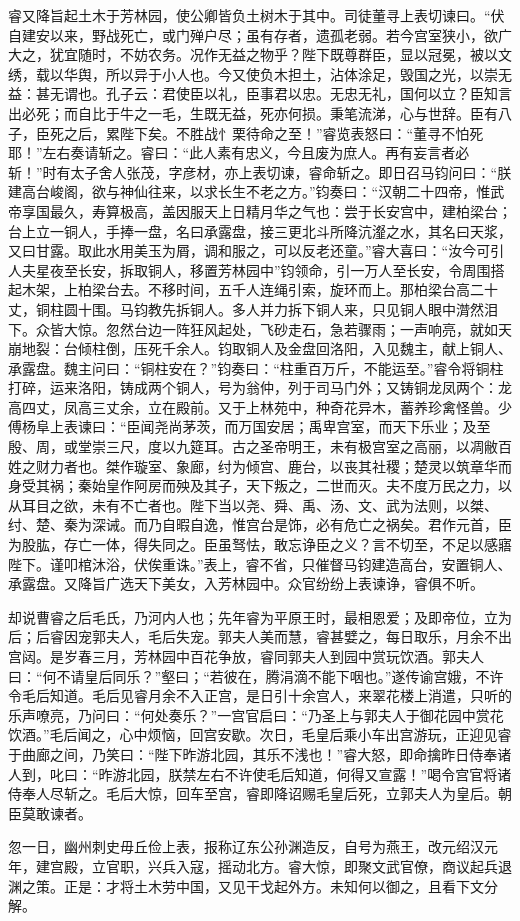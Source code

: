 睿又降旨起土木于芳林园，使公卿皆负土树木于其中。司徒董寻上表切谏曰。“伏自建安以来，野战死亡，或门殚户尽；虽有存者，遗孤老弱。若今宫室狭小，欲广大之，犹宜随时，不妨农务。况作无益之物乎？陛下既尊群臣，显以冠冕，被以文绣，载以华舆，所以异于小人也。今又使负木担土，沾体涂足，毁国之光，以崇无益：甚无谓也。孔子云：君使臣以礼，臣事君以忠。无忠无礼，国何以立？臣知言出必死；而自比于牛之一毛，生既无益，死亦何损。秉笔流涕，心与世辞。臣有八子，臣死之后，累陛下矣。不胜战忄栗待命之至！”睿览表怒曰：“董寻不怕死耶！”左右奏请斩之。睿曰：“此人素有忠义，今且废为庶人。再有妄言者必斩！”时有太子舍人张茂，字彦材，亦上表切谏，睿命斩之。即日召马钧问曰：“朕建高台峻阁，欲与神仙往来，以求长生不老之方。”钧奏曰：“汉朝二十四帝，惟武帝享国最久，寿算极高，盖因服天上日精月华之气也：尝于长安宫中，建柏梁台；台上立一铜人，手捧一盘，名曰承露盘，接三更北斗所降沆瀣之水，其名曰天浆，又曰甘露。取此水用美玉为屑，调和服之，可以反老还童。”睿大喜曰：“汝今可引人夫星夜至长安，拆取铜人，移置芳林园中”钧领命，引一万人至长安，令周围搭起木架，上柏梁台去。不移时间，五千人连绳引索，旋环而上。那柏梁台高二十丈，铜柱圆十围。马钧教先拆铜人。多人并力拆下铜人来，只见铜人眼中潸然泪下。众皆大惊。忽然台边一阵狂风起处，飞砂走石，急若骤雨；一声响亮，就如天崩地裂：台倾柱倒，压死千余人。钧取铜人及金盘回洛阳，入见魏主，献上铜人、承露盘。魏主问曰：“铜柱安在？”钧奏曰：“柱重百万斤，不能运至。”睿令将铜柱打碎，运来洛阳，铸成两个铜人，号为翁仲，列于司马门外；又铸铜龙凤两个：龙高四丈，凤高三丈余，立在殿前。又于上林苑中，种奇花异木，蓄养珍禽怪兽。少傅杨阜上表谏曰：“臣闻尧尚茅茨，而万国安居；禹卑宫室，而天下乐业；及至殷、周，或堂崇三尺，度以九筵耳。古之圣帝明王，未有极宫室之高丽，以凋敝百姓之财力者也。桀作璇室、象廊，纣为倾宫、鹿台，以丧其社稷；楚灵以筑章华而身受其祸；秦始皇作阿房而殃及其子，天下叛之，二世而灭。夫不度万民之力，以从耳目之欲，未有不亡者也。陛下当以尧、舜、禹、汤、文、武为法则，以桀、纣、楚、秦为深诫。而乃自暇自逸，惟宫台是饰，必有危亡之祸矣。君作元首，臣为股肱，存亡一体，得失同之。臣虽驽怯，敢忘诤臣之义？言不切至，不足以感寤陛下。谨叩棺沐浴，伏俟重诛。”表上，睿不省，只催督马钧建造高台，安置铜人、承露盘。又降旨广选天下美女，入芳林园中。众官纷纷上表谏诤，睿俱不听。

却说曹睿之后毛氏，乃河内人也；先年睿为平原王时，最相恩爱；及即帝位，立为后；后睿因宠郭夫人，毛后失宠。郭夫人美而慧，睿甚嬖之，每日取乐，月余不出宫闼。是岁春三月，芳林园中百花争放，睿同郭夫人到园中赏玩饮酒。郭夫人曰：“何不请皇后同乐？”壑曰；“若彼在，腾涓滴不能下咽也。”遂传谕宫娥，不许令毛后知道。毛后见睿月余不入正宫，是日引十余宫人，来翠花楼上消遣，只听的乐声嘹亮，乃问曰：“何处奏乐？”一宫官启曰：“乃圣上与郭夫人于御花园中赏花饮酒。”毛后闻之，心中烦恼，回宫安歇。次日，毛皇后乘小车出宫游玩，正迎见睿于曲廊之间，乃笑曰：“陛下昨游北园，其乐不浅也！”睿大怒，即命擒昨日侍奉诸人到，叱曰：“昨游北园，朕禁左右不许使毛后知道，何得又宣露！”喝令宫官将诸侍奉人尽斩之。毛后大惊，回车至宫，睿即降诏赐毛皇后死，立郭夫人为皇后。朝臣莫敢谏者。

忽一日，幽州刺史毋丘俭上表，报称辽东公孙渊造反，自号为燕王，改元绍汉元年，建宫殿，立官职，兴兵入寇，摇动北方。睿大惊，即聚文武官僚，商议起兵退渊之策。正是：才将土木劳中国，又见干戈起外方。未知何以御之，且看下文分解。